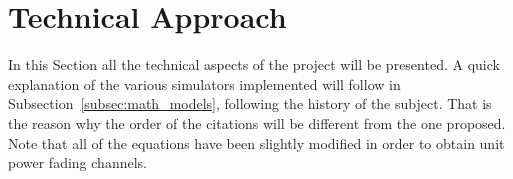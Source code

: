 \section{Technical Approach}	%
\label{sec:technical_approach}

In this Section all the technical aspects of the project will be presented. A quick explanation of the various simulators implemented will follow in Subsection~\ref{subsec:math_models}, following the history of the subject. That is the reason why the order of the citations will be different from the one proposed. Note that all of the equations have been slightly modified in order to obtain unit power fading channels.





